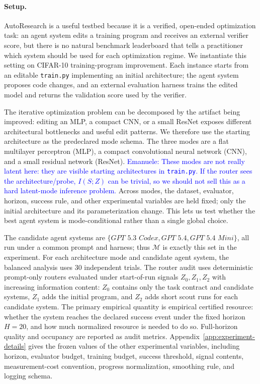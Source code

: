 \documentclass{article}
\newcommand{\cM}{\mathcal{M}}
\begin{document}
\paragraph{Setup.}
AutoResearch is a useful testbed because it is a verified, open-ended optimization task: an agent system edits a training program and receives an external verifier score, but there is no natural benchmark leaderboard that tells a practitioner which system should be used for each optimization regime.
We instantiate this setting on CIFAR-10 training-program improvement.  Each instance starts from an editable \texttt{train.py} implementing an initial architecture; the agent system proposes code changes, and an external evaluation harness trains the edited model and returns the validation score used by the verifier.

The iterative optimization problem can be decomposed by the artifact being improved: editing an MLP, a compact CNN, or a small ResNet exposes different architectural bottlenecks and useful edit patterns.
We therefore use the starting architecture as the predeclared mode schema.  The three modes are a flat multilayer perceptron (MLP), a compact convolutional neural network (CNN), and a small residual network (ResNet).
\textcolor{blue}{Emanuele: These modes are not really latent here: they are visible starting architectures in \texttt{train.py}. If the router sees the architecture/probe, \(I(S;Z)\) can be trivial, so we should not sell this as a hard latent-mode inference problem.}
Across modes, the dataset, evaluator, horizon, success rule, and other experimental variables are held fixed; only the initial architecture and its parameterization change.
This lets us test whether the best agent system is mode-conditional rather than a single global choice.

The candidate agent systems are \(\{\textit{GPT 5.3 Codex},\textit{GPT 5.4},\textit{GPT 5.4 Mini}\}\), all run under a common prompt and harness; thus \(\cM\) is exactly this set in the experiment.
For each architecture mode and candidate agent system, the balanced analysis uses 30 independent trials.
The router audit uses deterministic prompt-only routers evaluated under start-of-run signals \(Z_0,Z_1,Z_2\) with increasing information content: \(Z_0\) contains only the task contract and candidate systems, \(Z_1\) adds the initial program, and \(Z_2\) adds short scout runs for each candidate system.
The primary empirical quantity is empirical certified resource: whether the system reaches the declared success event under the fixed horizon \(H=20\), and how much normalized resource is needed to do so.  Full-horizon quality and occupancy are reported as audit metrics.
Appendix~\ref{app:experiment-details} gives the frozen values of the other experimental variables, including horizon, evaluator budget, training budget, success threshold, signal contents, measurement-cost convention, progress normalization, smoothing rule, and logging schema.
\end{document}
